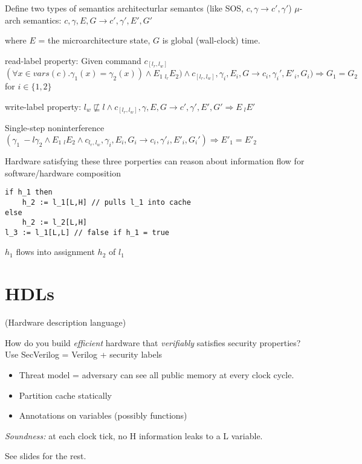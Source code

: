 \documentclass{article}
\newcommand{\la}{^{\leftarrow}}
\newcommand{\ra}{^{\rightarrow}}
\begin{document}
Define two types of semantics
architecturlar semantcs (like SOS, $c,\gamma \longrightarrow c',\gamma'$)
$\mu$-arch semantics: $c,\gamma,E,G \longrightarrow c',\gamma',E',G'$

where $E$ =  the microarchitecture state, $G$ is global (wall-clock) time.
 
read-label property: Given command $c_[l_r,l_w]$
$(\forall x \in vars(c) . \gamma_1(x) = \gamma_2(x)) \land E_1 ~_{l_r} E_2) \land c_[l_r,l_w],\gamma_i,E_i,G \longrightarrow c_i,\gamma_i',E'_i,G_i)  \Rightarrow G_1 = G_2$ for $i \in 
\{1,2\}$

write-label property: $l_w \not\sqsubseteq l \land c_{[l_r,l_w]}, \gamma,E,G \longrightarrow c', \gamma',E',G' \Rightarrow E ~_l E' $

Single-step noninterference
$(\gamma_1 ~-l \gamma_2 \land E_1 ~_l E_2 \land c_{l_r,l_w},\gamma_i,E_i,G_i \longrightarrow c_i,\gamma'_i,E'_i,G_i') \Rightarrow E'_1 = E'_2$

Hardware satisfying these three porperties can reason about information flow for software/hardware composition

\begin{lstlisting}[mathescape]
if h_1 then
    h_2 := l_1[L,H] // pulls l_1 into cache
else 
    h_2 := l_2[L,H]
l_3 := l_1[L,L] // false if h_1 = true
\end{lstlisting}
$h_1$ flows into assignment $h_2$ of $l_1$

\section{HDLs}
(Hardware description language)

How do you build \emph{efficient} hardware that \emph{verifiably} satisfies security properties?
Use SecVerilog = Verilog + security labels

\begin{itemize}
\item Threat model = adversary can see all public memory at every clock cycle.

\item Partition cache statically

\item Annotations on variables (possibly functions)
  
\end{itemize}

\emph{Soundness:} at each clock tick, no H information leaks to a L variable.
  
See slides for the rest.
\begin{figure}[ht!]
\label{fig1}
\end{figure}
\end{document}
